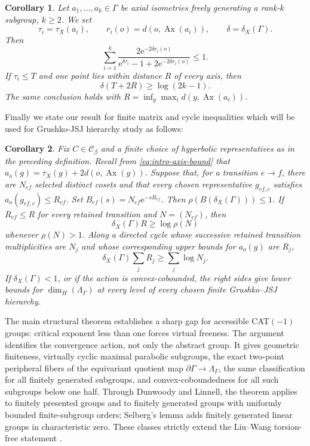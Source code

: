 \documentclass[11pt]{article}
\newtheorem{corollary}[corollary]{Corollary}
\theoremstyle{definition}
\newcommand{\Ax}{\operatorname{Ax}}
\newcommand{\e}{\mathrm e}
\begin{document}
\begin{corollary}
\label{cor:free-family-axis-bound}
Let $a_1,\dots,a_k\in\Gamma$ be axial isometries freely generating a rank-$k$ subgroup,
$k\ge2$.  We set
\[
 \tau_i=\tau_X(a_i),\qquad r_i(o)=d(o,\Ax(a_i)),\qquad \delta=\delta_X(\Gamma).
\]
Then
\begin{equation}\label{eq:free-family-axis-bound}
 \sum_{i=1}^k
 \frac{2\e^{-2\delta r_i(o)}}
 {\e^{\delta\tau_i}-1+2\e^{-2\delta r_i(o)}}\le1.
\end{equation}
If $\tau_i\le T$ and one point lies within distance $R$ of every axis, then
\begin{equation}\label{eq:free-family-uniform-bound}
 \delta(T+2R)\ge\log(2k-1).
\end{equation}
The same conclusion holds with $R=\inf_y\max_i d(y,\Ax(a_i))$.
\end{corollary}
Finally we state our result for finite matrix and cycle inequalities which will be used for Grushko-JSJ hierarchy study as follows:
\begin{corollary}
\label{cor:finite-matrix-cycle}
Fix $C\in\mathscr C_\beta$ and a finite choice of hyperbolic representatives as in the
preceding definition.  Recall from \eqref{eq:intro-axis-bound} that
$a_o(g)=\tau_X(g)+2d(o,\Ax(g))$.  Suppose that, for a transition $e\to f$, there are
$N_{ef}$ selected distinct cosets and that every chosen representative $g_{ef,c}$ satisfies
$a_o(g_{ef,c})\le R_{ef}$.  Set $B_{ef}(s)=N_{ef}\e^{-sR_{ef}}$.  Then
$\rho(B(\delta_X(\Gamma)))\le1$.  If $R_{ef}\le R$ for every retained transition and
$N=(N_{ef})$, then
\begin{equation}\label{eq:matrix-dimension-bound}
 \delta_X(\Gamma)R\ge\log\rho(N)
\end{equation}
whenever $\rho(N)>1$.  Along a directed cycle whose successive retained transition
multiplicities are $N_j$ and whose corresponding upper bounds for $a_o(g)$ are $R_j$,
\begin{equation}\label{eq:cycle-axis-bound}
 \delta_X(\Gamma)\sum_jR_j\ge\sum_j\log N_j.
\end{equation}
If $\delta_X(\Gamma)<1$, or if the action is convex-cobounded, the right sides give lower
bounds for $\dim_H(\Lambda_\Gamma)$ at every level of every chosen finite Grushko--JSJ
hierarchy.
\end{corollary}

The main structural theorem establishes a sharp gap for accessible CAT$(-1)$ groups: critical
exponent less than one forces virtual freeness.  The argument identifies the convergence
action, not only the abstract group.  It gives geometric finiteness, virtually cyclic maximal
parabolic subgroups, the exact two-point peripheral fibers of the equivariant quotient map
$\partial\Gamma\to\Lambda_\Gamma$, the same classification for all finitely generated
subgroups, and convex-coboundedness for all such subgroups below one half.  Through Dunwoody
and Linnell, the theorem applies to finitely presented groups and to finitely generated groups
with uniformly bounded finite-subgroup orders; Selberg's lemma adds finitely generated linear
groups in characteristic zero.  These classes strictly extend the Liu--Wang torsion-free
statement \cite{LiuWang2023}.
\end{document}

